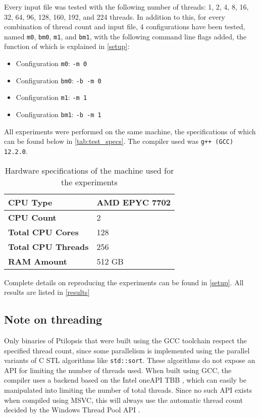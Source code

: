 \documentclass[11pt,dvipsnames]{article}
\newcommand{\icpp}[1]{\texttt{#1}}
\newcommand{\mono}[1]{\texttt{#1}}
\newcommand{\Rplus}{\protect\hspace{-.1em}\protect\raisebox{.35ex}{\smaller{\smaller\textbf{+}}}}
\newcommand{\Cpp}{\mbox{C\Rplus\Rplus}\xspace}
\begin{document}
Every input file was tested with the following number of threads: 1, 2, 4, 8, 16, 32, 64, 96, 128, 160, 192, and 224 threads. In addition to this, for every combination of thread count and input file, 4 configurations have been tested, named \mono{m0}, \mono{bm0}, \mono{m1}, and \mono{bm1}, with the following command line flags added, the function of which is explained in \autoref{setup}:
\begin{itemize}
    \item Configuration \mono{m0}: \mono{-m 0}
    \item Configuration \mono{bm0}: \mono{-b -m 0}
    \item Configuration \mono{m1}: \mono{-m 1}
    \item Configuration \mono{bm1}: \mono{-b -m 1}
\end{itemize}

All experiments were performed on the same machine, the specifications of which can be found below in \autoref{tab:test_specs}. The compiler used was \mono{g++ (GCC) 12.2.0}.

\begin{table}[ht]
    \centering
    \begin{tabular}{|l|l|}
        \hline
        \textbf{CPU Type} & AMD EPYC 7702 \\
        \hline
        \textbf{CPU Count} & 2 \\
        \hline
        \textbf{Total CPU Cores} & 128 \\
        \hline
        \textbf{Total CPU Threads} & 256 \\
        \hline
        \textbf{RAM Amount} & 512 GB \\
        \hline
    \end{tabular}
    \caption{Hardware specifications of the machine used for the experiments}
    \label{tab:test_specs}
\end{table}

Complete details on reproducing the experiments can be found in \autoref{setup}. All results are listed in \autoref{results}

\subsection*{Note on threading}
Only binaries of Ptilopsis that were built using the GCC toolchain respect the specified thread count, since some parallelism is implemented using the parallel variants of \Cpp STL algorithms like \icpp{std::sort}. These algorithms do not expose an API for limiting the number of threads used. When built using GCC, the compiler uses a backend based on the Intel oneAPI TBB \cite{oneapi}, which can easily be manipulated into limiting the number of total threads. Since no such API exists when compiled using MSVC, this will always use the automatic thread count decided by the Windows Thread Pool API \cite{win32threadpool}.
\end{document}
